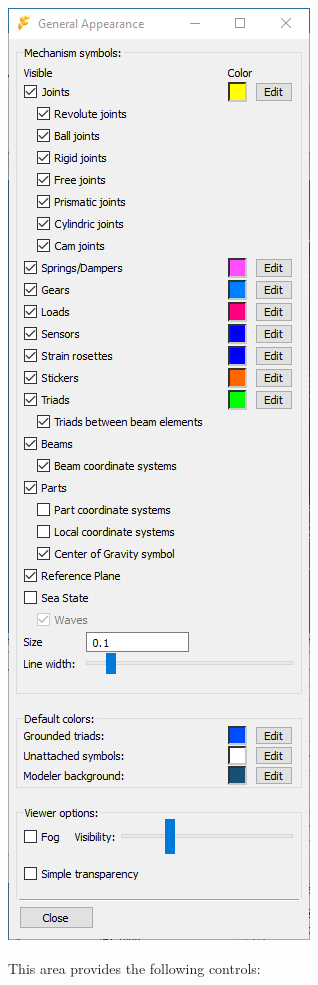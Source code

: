 \begin{minipage}{0.4\textwidth}
  \raggedleft
  \includegraphics[trim=0 400 0 0,clip,scale=0.55]{Figures/Dialogs/2-GeneralAppearance}
\end{minipage}


This area provides the following controls:

